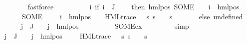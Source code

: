\begin{isabellebody}
\ \ \ \ \ \ \isamarkupfalse%
\ fastforce\isanewline
\ \ \ \ \isamarkupfalse%
\ {\isasymPsi}\ \ {\isachardoublequoteopen}{\isasymPsi}\ {\isasymequiv}\ {\isacharparenleft}{\kern0pt}{\isasymlambda}i{\isachardot}{\kern0pt}\ {\isacharparenleft}{\kern0pt}if\ i\ {\isasymin}\ J\isanewline
\ \ \ \ then\ {\isacharparenleft}{\kern0pt}hml{\isacharunderscore}{\kern0pt}pos\ {\isacharparenleft}{\kern0pt}SOME\ {\isasymalpha}{\isachardot}{\kern0pt}\ {\isasymexists}{\isasymphi}{\isachardot}{\kern0pt}\ {\isasymPhi}\ i\ {\isacharequal}{\kern0pt}\ hml{\isacharunderscore}{\kern0pt}pos\ {\isasymalpha}\ {\isasymphi}{\isacharparenright}{\kern0pt}\ \isanewline
\ \ \ \ \ \ {\isacharparenleft}{\kern0pt}SOME\ {\isasympsi}{\isachardot}{\kern0pt}\ {\isasymexists}{\isasymalpha}\ {\isasymphi}{\isachardot}{\kern0pt}\ {\isasymPhi}\ i\ {\isacharequal}{\kern0pt}\ hml{\isacharunderscore}{\kern0pt}pos\ {\isasymalpha}\ {\isasymphi}\ {\isasymand}\ HML{\isacharunderscore}{\kern0pt}trace\ {\isasympsi}\ {\isasymand}\ {\isacharparenleft}{\kern0pt}{\isasymforall}s{\isachardot}{\kern0pt}\ s\ {\isasymTurnstile}\ {\isasymphi}\ {\isasymlongleftrightarrow}\ s\ {\isasymTurnstile}\ {\isasympsi}{\isacharparenright}{\kern0pt}{\isacharparenright}{\kern0pt}{\isacharparenright}{\kern0pt}\ \isanewline
\ \ \ \ else\ undefined{\isacharparenright}{\kern0pt}{\isacharparenright}{\kern0pt}{\isachardoublequoteclose}\isanewline
\ \ \ \ \isamarkupfalse%
\ {\isachardoublequoteopen}{\isasymforall}j\ {\isasymin}\ J{\isachardot}{\kern0pt}\ {\isasymexists}{\isasymalpha}\ {\isasympsi}{\isachardot}{\kern0pt}\ {\isasymPsi}\ j\ {\isacharequal}{\kern0pt}\ hml{\isacharunderscore}{\kern0pt}pos\ {\isasymalpha}\ {\isasympsi}{\isachardoublequoteclose}\isanewline
\ \ \ \ \ \ \isamarkupfalse%
\ SOME{\isacharunderscore}{\kern0pt}ex\ \isanewline
\ \ \ \ \ \ \isamarkupfalse%
\ simp\isanewline
\ \ \ \ \isamarkupfalse%
\ {\isachardoublequoteopen}{\isasymforall}j\ {\isasymin}\ J{\isachardot}{\kern0pt}\ {\isasymexists}{\isasymalpha}\ {\isasymphi}{\isachardot}{\kern0pt}\ {\isasymPhi}\ j\ {\isacharequal}{\kern0pt}\ hml{\isacharunderscore}{\kern0pt}pos\ {\isasymalpha}\ {\isasymphi}\ {\isasymand}\ {\isacharparenleft}{\kern0pt}{\isasymexists}{\isasympsi}{\isachardot}{\kern0pt}\ HML{\isacharunderscore}{\kern0pt}trace\ {\isasympsi}\ {\isasymand}\ {\isacharparenleft}{\kern0pt}{\isasymforall}s{\isachardot}{\kern0pt}\ s\ {\isasymTurnstile}\ {\isasymphi}\ {\isasymlongleftrightarrow}\ s\ {\isasymTurnstile}\ {\isasympsi}{\isacharparenright}{\kern0pt}{\isacharparenright}{\kern0pt}{\isachardoublequoteclose}\isanewline

\end{isabellebody}
